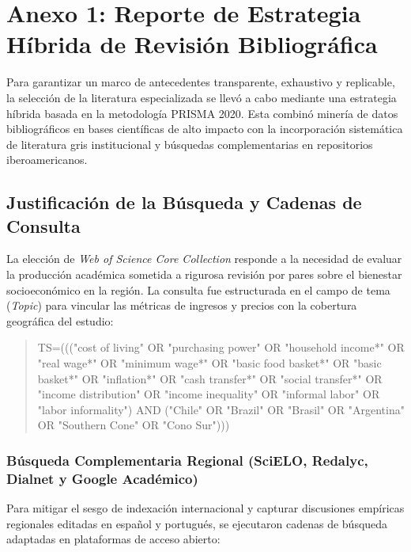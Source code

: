 \section{Anexo 1: Reporte de Estrategia Híbrida de Revisión Bibliográfica}

Para garantizar un marco de antecedentes transparente, exhaustivo y replicable, la selección de la literatura especializada se llevó a cabo mediante una estrategia híbrida basada en la metodología PRISMA 2020. Esta combinó minería de datos bibliográficos en bases científicas de alto impacto con la incorporación sistemática de literatura gris institucional y búsquedas complementarias en repositorios iberoamericanos.

\subsection{Justificación de la Búsqueda y Cadenas de Consulta}
La elección de \textit{Web of Science Core Collection} responde a la necesidad de evaluar la producción académica sometida a rigurosa revisión por pares sobre el bienestar socioeconómico en la región. La consulta fue estructurada en el campo de tema (\textit{Topic}) para vincular las métricas de ingresos y precios con la cobertura geográfica del estudio:

\begin{quote}
\small\ttfamily\raggedright
TS=((("cost of living" OR "purchasing power" OR "household income*" OR "real wage*" OR "minimum wage*" OR "basic food basket*" OR "basic basket*" OR "inflation*" OR "cash transfer*" OR "social transfer*" OR "income distribution" OR "income inequality" OR "informal labor" OR "labor informality") AND ("Chile" OR "Brazil" OR "Brasil" OR "Argentina" OR "Southern Cone" OR "Cono Sur")))
\end{quote}

\subsubsection{Búsqueda Complementaria Regional (SciELO, Redalyc, Dialnet y Google Académico)}
Para mitigar el sesgo de indexación internacional y capturar discusiones empíricas regionales editadas en español y portugués, se ejecutaron cadenas de búsqueda adaptadas en plataformas de acceso abierto:

